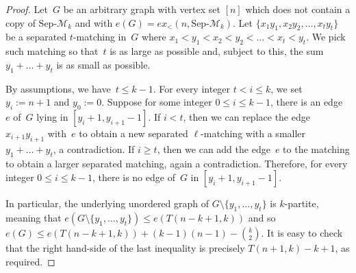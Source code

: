 \documentclass[11pt]{article}
\newtheorem{theorem}{Theorem}[section]
\theoremstyle{definition}
\begin{document}
\begin{proof}
Let~$G$ be an arbitrary graph with vertex set $[n]$ which does not contain a copy of $\text{Sep-}\mathcal M_k$ and with $e(G)=ex_<(n,\text{Sep-}\mathcal M_k)$.
Let $\{x_1y_1,x_2y_2,\dots,x_t y_t\}$ be a separated $t$-matching in~$G$ where $x_1<y_1<x_2<y_2<\dots<x_t<y_t$.
We pick such matching so that~$t$ is as large as possible and, subject to this, the sum $y_1+\dots+y_t$ is as small as possible.

By assumptions, we have~$t\le k-1$.
For every integer $t<i\le k$, we set $y_i:=n+1$ and $y_0:=0$.
Suppose for some integer $0\le i\le k-1$, there is an edge~$e$ of~$G$ lying in $[y_i+1,y_{i+1}-1]$.
If $i<t$, then we can replace the edge~$x_{i+1}y_{i+1}$ with~$e$ to obtain a new separated $\ell$-matching with a smaller $y_1+\dots+y_t$, a contradiction.
If $i\ge t$, then we can add the edge~$e$ to the matching to obtain a larger separated matching, again a contradiction.
Therefore, for every integer $0\le i\le k-1$, there is no edge of~$G$ in $[y_i+1,y_{i+1}-1]$.

In particular, the underlying unordered graph of $G\setminus\{y_1,\dots,y_t\}$ is $k$-partite, meaning that $e(G\setminus\{y_1,\dots,y_t\})\le e(T(n-k+1,k))$ and so $e(G)\le e(T(n-k+1,k)) + (k-1)(n-1) -\binom{k}{2}$.
It is easy to check that the right hand-side of the last inequality is precisely $T(n+1,k)-k+1$, as required.
\end{proof}


\end{document}
